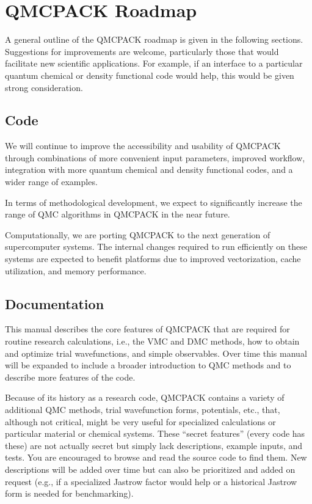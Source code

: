 \documentclass[letterpaper,10pt,english]{sphinxmanual}
\begin{document}
\section{QMCPACK Roadmap}
\label{\detokenize{introduction:qmcpack-roadmap}}\label{\detokenize{introduction:roadmap}}
A general outline of the QMCPACK roadmap is given in the following sections. Suggestions for improvements are welcome, particularly those
that would facilitate new scientific applications. For example, if an
interface to a particular quantum chemical or density functional code
would help, this would be given strong consideration.


\subsection{Code}
\label{\detokenize{introduction:code}}
We will continue to improve the accessibility and usability of QMCPACK
through combinations of more convenient input parameters, improved
workflow, integration with more quantum chemical and density functional
codes, and a wider range of examples.

In terms of methodological development, we expect to significantly
increase the range of QMC algorithms in QMCPACK in the near future.

Computationally, we are porting QMCPACK to the next generation of
supercomputer systems. The internal changes required to run efficiently
on these systems are expected to benefit  platforms due to improved
vectorization, cache utilization, and memory performance.


\subsection{Documentation}
\label{\detokenize{introduction:documentation}}
This manual describes the core features of QMCPACK that are required for
routine research calculations, i.e., the VMC and DMC methods, how to
obtain and optimize trial wavefunctions, and simple observables. Over
time this manual will be expanded to include a broader introduction to
QMC methods and to describe more features of the code.

Because of its history as a research code, QMCPACK contains a variety of
additional QMC methods, trial wavefunction forms, potentials, etc.,
that, although not critical, might be very useful for specialized
calculations or particular material or chemical systems. These “secret
features” (every code has these) are not actually secret but simply lack
descriptions, example inputs, and tests. You are encouraged to browse
and read the source code to find them. New descriptions will be added
over time but can also be prioritized and added on request (e.g., if a
specialized Jastrow factor would help or a historical Jastrow form is
needed for benchmarking).
\end{document}
